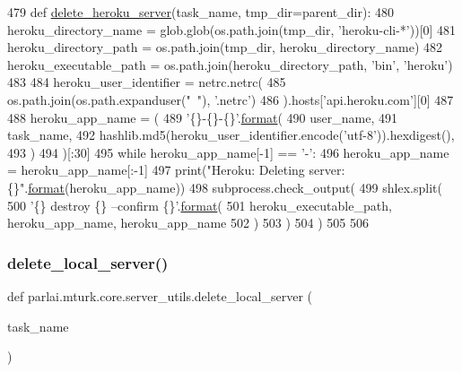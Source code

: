 \begin{DoxyCode}
479 \textcolor{keyword}{def }\hyperlink{namespaceparlai_1_1mturk_1_1core_1_1server__utils_a8dfde882f9d6ff492ca565ae2334fc70}{delete\_heroku\_server}(task\_name, tmp\_dir=parent\_dir):
480     heroku\_directory\_name = glob.glob(os.path.join(tmp\_dir, \textcolor{stringliteral}{'heroku-cli-*'}))[0]
481     heroku\_directory\_path = os.path.join(tmp\_dir, heroku\_directory\_name)
482     heroku\_executable\_path = os.path.join(heroku\_directory\_path, \textcolor{stringliteral}{'bin'}, \textcolor{stringliteral}{'heroku'})
483 
484     heroku\_user\_identifier = netrc.netrc(
485         os.path.join(os.path.expanduser(\textcolor{stringliteral}{"~"}), \textcolor{stringliteral}{'.netrc'})
486     ).hosts[\textcolor{stringliteral}{'api.heroku.com'}][0]
487 
488     heroku\_app\_name = (
489         \textcolor{stringliteral}{'\{\}-\{\}-\{\}'}.\hyperlink{namespaceparlai_1_1chat__service_1_1services_1_1messenger_1_1shared__utils_a32e2e2022b824fbaf80c747160b52a76}{format}(
490             user\_name,
491             task\_name,
492             hashlib.md5(heroku\_user\_identifier.encode(\textcolor{stringliteral}{'utf-8'})).hexdigest(),
493         )
494     )[:30]
495     \textcolor{keywordflow}{while} heroku\_app\_name[-1] == \textcolor{stringliteral}{'-'}:
496         heroku\_app\_name = heroku\_app\_name[:-1]
497     print(\textcolor{stringliteral}{"Heroku: Deleting server: \{\}"}.\hyperlink{namespaceparlai_1_1chat__service_1_1services_1_1messenger_1_1shared__utils_a32e2e2022b824fbaf80c747160b52a76}{format}(heroku\_app\_name))
498     subprocess.check\_output(
499         shlex.split(
500             \textcolor{stringliteral}{'\{\} destroy \{\} --confirm \{\}'}.\hyperlink{namespaceparlai_1_1chat__service_1_1services_1_1messenger_1_1shared__utils_a32e2e2022b824fbaf80c747160b52a76}{format}(
501                 heroku\_executable\_path, heroku\_app\_name, heroku\_app\_name
502             )
503         )
504     )
505 
506 
\end{DoxyCode}
\mbox{\label{namespaceparlai_1_1mturk_1_1core_1_1server__utils_a9b4f4c3f696be001c2fa96b3690af83c}} 
\subsubsection{\texorpdfstring{delete\+\_\+local\+\_\+server()}{delete\_local\_server()}}
{\footnotesize\ttfamily def parlai.\+mturk.\+core.\+server\+\_\+utils.\+delete\+\_\+local\+\_\+server (\begin{DoxyParamCaption}\item[{}]{task\+\_\+name }\end{DoxyParamCaption})}



